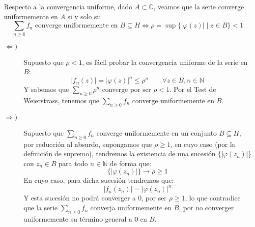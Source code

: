 \documentclass[12pt]{article}
\begin{document}
\begin{ejercicio}[3 puntos]
        Respecto a la convergencia uniforme, dado $A\subset \mathbb{C}$, veamos que la serie converge uniformemente en $A$ si y solo si:
        \begin{equation*}
            \sum_{n\geq 0} f_n \text{\ converge uniformemente en\ } B \subseteq H \Longleftrightarrow \rho = \sup\{|\varphi(z)| \mid z\in B\} < 1
        \end{equation*}
        \begin{description}
            \item [$\Longleftarrow)$] Supuesto que $\rho < 1$, es fácil probar la convergencia uniforme de la serie en $B$:
                \begin{equation*}
                    |f_n(z)| = {|\varphi(z)|}^{n} \leq \rho^n \qquad \forall z\in B, n\in \mathbb{N}
                \end{equation*}
                Y sabemos que $\sum\limits_{n\geq 0}\rho^n$ converge por ser $\rho < 1$. Por el Test de Weierstrass, tenemos que $\sum\limits_{n\geq 0}f_n$ converge uniformemente en $B$.
            \item [$\Longrightarrow)$] Supuesto que $\sum\limits_{n\geq 0}f_n$ converge uniformemente en un conjunto $B\subseteq H$, por reducción al absurdo, supongamos que $\rho \geq 1$, en cuyo caso (por la definición de supremo), tendremos la existencia de una sucesión $\{|\varphi(z_n)|\}$ con $z_n \in B$ para todo $n\in \mathbb{N}$ de forma que:
                \begin{equation*}
                    \{|\varphi(z_n)|\} \to \rho \geq 1
                \end{equation*}
                En cuyo caso, para dicha sucesión tendremos que:
                \begin{equation*}
                    |f_n(z_n)| = {|\varphi(z_n)|}^{n}
                \end{equation*}
                Y esta sucesión no podrá converger a 0, por ser $\rho \geq 1$, lo que contradice que la serie $\sum\limits_{n\geq 0} f_n$ converja uniformemente en $B$, por no converger uniformemente su término general a 0 en $B$.
        \end{description}
    \end{ejercicio}
\end{document}
